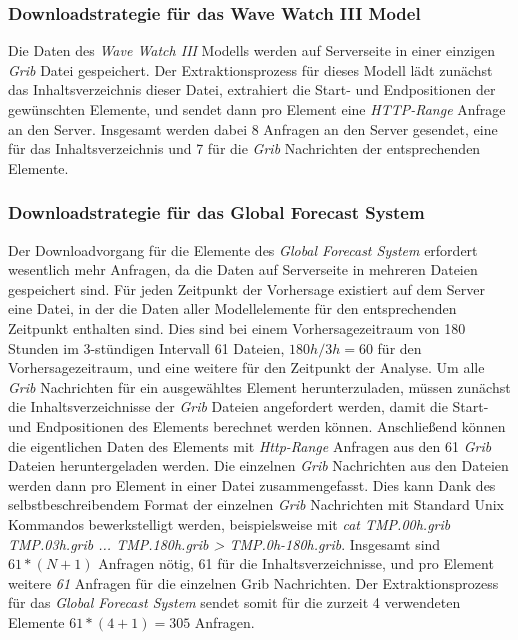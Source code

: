 \subsubsection{Downloadstrategie für das Wave Watch III Model}

Die Daten des \textit{Wave Watch III} Modells werden auf Serverseite
in einer einzigen \textit{Grib} Datei gespeichert. Der
Extraktionsprozess für dieses Modell lädt zunächst das
Inhaltsverzeichnis dieser Datei, extrahiert die Start- und
Endpositionen der gewünschten Elemente, und sendet dann pro Element
eine \textit{HTTP-Range} Anfrage an den Server. Insgesamt werden dabei
8 Anfragen an den Server gesendet, eine für das Inhaltsverzeichnis und
7 für die \textit{Grib} Nachrichten der entsprechenden Elemente.

\subsubsection{Downloadstrategie für das Global Forecast System}

Der Downloadvorgang für die Elemente des \textit{Global Forecast
  System} erfordert wesentlich mehr Anfragen, da die Daten auf
Serverseite in mehreren Dateien gespeichert sind. Für jeden Zeitpunkt
der Vorhersage existiert auf dem Server eine Datei, in der die Daten
aller Modellelemente für den entsprechenden Zeitpunkt enthalten
sind. Dies sind bei einem Vorhersagezeitraum von 180 Stunden im
3-stündigen Intervall 61 Dateien, $180h / 3h = 60$ für den
Vorhersagezeitraum, und eine weitere für den Zeitpunkt der Analyse. Um
alle \textit{Grib} Nachrichten für ein ausgewähltes Element
herunterzuladen, müssen zunächst die Inhaltsverzeichnisse der
\textit{Grib} Dateien angefordert werden, damit die Start- und
Endpositionen des Elements berechnet werden können. Anschließend
können die eigentlichen Daten des Elements mit \textit{Http-Range}
Anfragen aus den 61 \textit{Grib} Dateien heruntergeladen werden. Die
einzelnen \textit{Grib} Nachrichten aus den Dateien werden dann pro
Element in einer Datei zusammengefasst. Dies kann Dank des
selbstbeschreibendem Format der einzelnen \textit{Grib} Nachrichten
mit Standard Unix Kommandos bewerkstelligt werden, beispielsweise mit
\textit{cat TMP.00h.grib TMP.03h.grib ... TMP.180h.grib >
  TMP.0h-180h.grib}. Insgesamt sind $ 61 * (N+1) $ Anfragen nötig, 61
für die Inhaltsverzeichnisse, und pro Element weitere \textit{61}
Anfragen für die einzelnen Grib Nachrichten. Der Extraktionsprozess
für das \textit{Global Forecast System} sendet somit für die zurzeit 4
verwendeten Elemente $ 61 * (4+1) = 305$ Anfragen.

